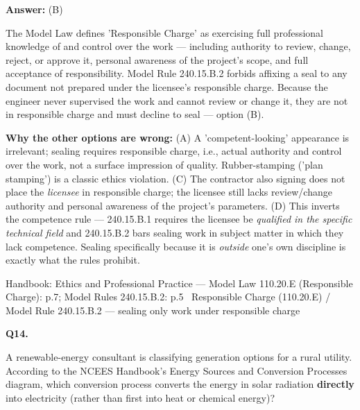 \documentclass[11pt]{article}
\begin{document}
\vspace{2pt}\par\noindent\colorbox{boxbg}{\parbox{\dimexpr\linewidth-2\fboxsep\relax}{%
\vspace{2pt}\textbf{Answer:} (B)\par\vspace{2pt}
{\small The Model Law defines 'Responsible Charge' as exercising full professional knowledge of and control over the work --- including authority to review, change, reject, or approve it, personal awareness of the project's scope, and full acceptance of responsibility. Model Rule 240.15.B.2 forbids affixing a seal to any document not prepared under the licensee's responsible charge. Because the engineer never supervised the work and cannot review or change it, they are not in responsible charge and must decline to seal --- option (B).\par
\textbf{Why the other options are wrong:} (A) A 'competent-looking' appearance is irrelevant; sealing requires responsible charge, i.e., actual authority and control over the work, not a surface impression of quality. Rubber-stamping ('plan stamping') is a classic ethics violation. (C) The contractor also signing does not place the \emph{licensee} in responsible charge; the licensee still lacks review/change authority and personal awareness of the project's parameters. (D) This inverts the competence rule --- 240.15.B.1 requires the licensee be \emph{qualified in the specific technical field} and 240.15.B.2 bars sealing work in subject matter in which they lack competence. Sealing specifically because it is \emph{outside} one's own discipline is exactly what the rules prohibit.\par}\par\vspace{2pt}
{\footnotesize\color{soft}Handbook: Ethics and Professional Practice --- Model Law 110.20.E (Responsible Charge): p.7; Model Rules 240.15.B.2: p.5 \textbullet\ Responsible Charge (110.20.E) / Model Rule 240.15.B.2 --- sealing only work under responsible charge}\vspace{2pt}
}}
\vspace{9pt}
\filbreak
\textbf{\color{accent}Q14.}\par\vspace{2pt}
A renewable-energy consultant is classifying generation options for a rural utility. According to the NCEES Handbook's Energy Sources and Conversion Processes diagram, which conversion process converts the energy in solar radiation \textbf{directly} into electricity (rather than first into heat or chemical energy)?\par\par\vspace{3pt}
\end{document}

